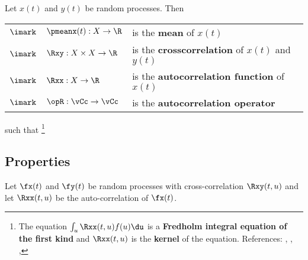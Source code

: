 \begin{definition}
\label{def:Rxx}
\label{def:opR}
\label{def:Rxy}
Let $x(t)$ and $y(t)$ be random processes.
Then

\begin{tabular}{cll}
   $\imark$ & $\pmeanx(t):X\to\R$       & is the \textbf{mean} of $x(t)$                          \\
   $\imark$ & $\Rxy:X\times X\to\R$ & is the \textbf{crosscorrelation} of $x(t)$ and $y(t)$   \\
   $\imark$ & $\Rxx:X\to\R$         & is the \textbf{autocorrelation function} of $x(t)$      \\
   $\imark$ & $\opR:\vCc\to\vCc$    & is the \textbf{autocorrelation operator}
\end{tabular}

such that
\footnote{
   The equation $\int_u \Rxx(t,u) f(u) \du$ is a
   \textbf{Fredholm integral equation of the first kind} and
   $\Rxx(t,u)$ is the \textbf{kernel} of the equation.
   References: 
     ,
     ,
     ,
   }
\end{definition}



\subsection{Properties}

\begin{theorem}
\label{thm:Rxx_prop}
Let $\fx(t)$ and $\fy(t)$ be random processes with
cross-correlation $\Rxy(t,u)$ and
let $\Rxx(t,u)$ be the auto-correlation of $\fx(t)$.
\end{theorem}

